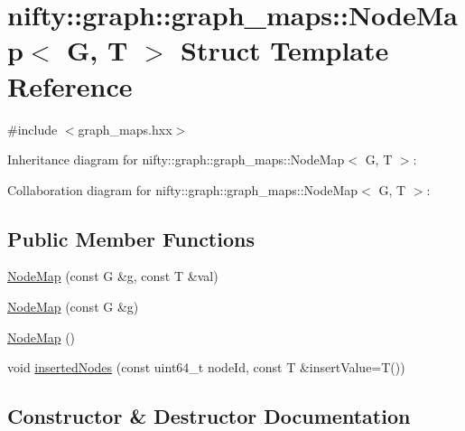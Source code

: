 \hypertarget{structnifty_1_1graph_1_1graph__maps_1_1NodeMap}{}\section{nifty\+:\+:graph\+:\+:graph\+\_\+maps\+:\+:Node\+Map$<$ G, T $>$ Struct Template Reference}
\label{structnifty_1_1graph_1_1graph__maps_1_1NodeMap}


{\ttfamily \#include $<$graph\+\_\+maps.\+hxx$>$}



Inheritance diagram for nifty\+:\+:graph\+:\+:graph\+\_\+maps\+:\+:Node\+Map$<$ G, T $>$\+:


Collaboration diagram for nifty\+:\+:graph\+:\+:graph\+\_\+maps\+:\+:Node\+Map$<$ G, T $>$\+:
\subsection*{Public Member Functions}
\begin{DoxyCompactItemize}
\item 
\hyperlink{structnifty_1_1graph_1_1graph__maps_1_1NodeMap_a0580548b98c3e769227111e081c0b7a6}{Node\+Map} (const G \&g, const T \&val)
\item 
\hyperlink{structnifty_1_1graph_1_1graph__maps_1_1NodeMap_a759dd195fba1b36d638635e10677e759}{Node\+Map} (const G \&g)
\item 
\hyperlink{structnifty_1_1graph_1_1graph__maps_1_1NodeMap_ac56649d6162ce84c37ffa6c096954bea}{Node\+Map} ()
\item 
void \hyperlink{structnifty_1_1graph_1_1graph__maps_1_1NodeMap_a63aea0a762e0ec912e8c9ef357268d09}{inserted\+Nodes} (const uint64\+\_\+t node\+Id, const T \&insert\+Value=T())
\end{DoxyCompactItemize}


\subsection{Constructor \& Destructor Documentation}
\hypertarget{structnifty_1_1graph_1_1graph__maps_1_1NodeMap_a0580548b98c3e769227111e081c0b7a6}{}
